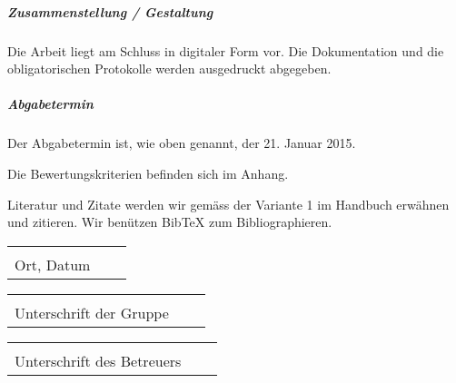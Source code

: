 \documentclass[parskip=half]{scrreprt}
\begin{document}
\begin{contract}
\subparagraph{Zusammenstellung / Gestaltung}
Die Arbeit liegt am Schluss in digitaler Form vor. Die Dokumentation und die obligatorischen Protokolle werden ausgedruckt abgegeben.

\subparagraph{Abgabetermin}
Der Abgabetermin ist, wie oben genannt, der 21. Januar 2015.


Die Bewertungskriterien befinden sich im Anhang.

Literatur und Zitate werden wir gemäss der Variante 1 im Handbuch erwähnen und zitieren.
Wir benützen BibTeX zum Bibliographieren.

\end{contract} 
  
 

\vspace{1,5 cm} 
\begin{tabular}{p{7cm}p{.5cm}l}
\dotfill \\ 
Ort, Datum
\end{tabular}%

\vspace{1,5 cm} 
\begin{tabular}{p{7cm}p{.5cm}l}
\dotfill \\ 
Unterschrift der Gruppe 
\end{tabular}%
\hfill 
\begin{tabular}{p{7cm}p{.5cm}l}
\dotfill \\ 
Unterschrift des Betreuers
\end{tabular}%
  
\end{document}
